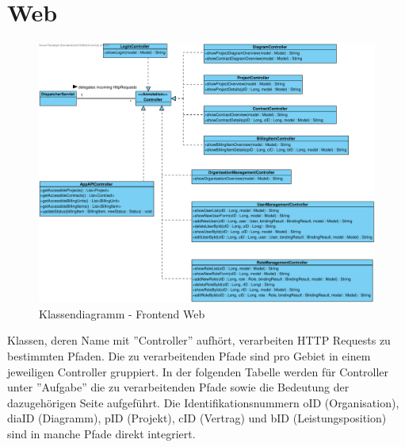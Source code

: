 \clearpage

\section{Web}

\begin{figure}[h]
	\centering
	\includegraphics[width=\linewidth]{img/diagrams/Frontend Classes.pdf}
	\caption{Klassendiagramm - Frontend Web}
	\label{fig:klassendiagramm-web}
\end{figure}

\noindent
Klassen, deren Name mit ''Controller'' aufhört, verarbeiten HTTP Requests zu bestimmten Pfaden.
Die zu verarbeitenden Pfade sind pro Gebiet in einem jeweiligen Controller gruppiert.
In der folgenden Tabelle werden für Controller unter ''Aufgabe'' die zu verarbeitenden Pfade sowie die Bedeutung der dazugehörigen Seite aufgeführt.
Die Identifikationsnummern oID (Organisation), diaID (Diagramm), pID (Projekt), cID (Vertrag) und bID (Leistungsposition) sind in manche Pfade direkt integriert.\\


